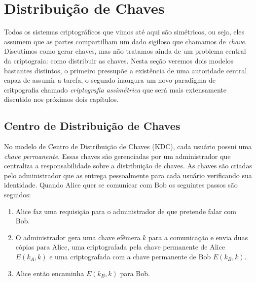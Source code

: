 \chapter{Distribuição de Chaves}
\label{cha:distribuicao-chaves}

Todos os sistemas criptográficos que vimos até aqui são simétricos, ou seja, eles assumem que as partes compartilham um dado sigiloso que chamamos de {\em chave}.
Discutimos como gerar chaves, mas não tratamos ainda de um problema central da criptograia: como distribuir as chaves.
Nesta seção veremos dois modelos bastantes distintos, o primeiro pressupõe a existência de uma autoridade central capaz de assumir a tarefa, o segundo inaugura um novo paradigma de critpografia chamado {\em criptografia assimétrica} que será mais extensamente discutido nos próximos dois capítulos.

\section{Centro de Distribuição de Chaves}
\label{sec:kdc}

No modelo de Centro de Distribuição de Chaves (KDC), cada usuário possui uma {\em chave permanente}.
Essas chaves são gerenciadas por um administrador que centraliza a responsabilidade sobre a distribuição de chaves.
As chaves são criadas pelo administrador que as entrega pessoalmente para cada usuário verificando sua identidade.
Quando Alice quer se comunicar com Bob os seguintes passos são seguidos:

\begin{enumerate}
\item Alice faz uma requisição para o administrador de que pretende falar com Bob.
\item O administrador gera uma chave efêmera $k$ para a comunicação e envia duas cópias para Alice, uma criptografada pela chave permanente de Alice $E(k_A, k)$ e uma criptografada com a chave permanente de Bob $E(k_B, k)$.
\item Alice então encaminha $E(k_B, k)$ para Bob.
\end{enumerate}

\begin{center}
\end{center}

